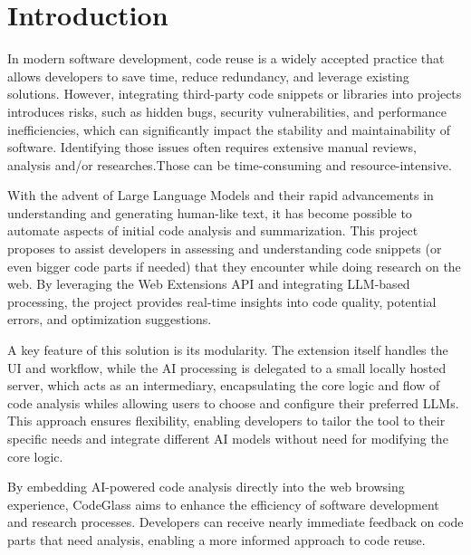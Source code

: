 \section{Introduction}

In modern software development, code reuse is a widely accepted practice that
allows developers to save time, reduce redundancy, and leverage existing solutions.
However, integrating third-party code snippets or libraries into projects introduces 
risks, such as hidden bugs, security vulnerabilities, and
performance inefficiencies, which can significantly impact the stability and
maintainability of software. Identifying those issues often requires extensive
manual reviews, analysis and/or researches.Those can be time-consuming and
resource-intensive.

With the advent of Large Language Models and their rapid advancements in
understanding and generating human-like text, it has become possible to automate
aspects of initial code analysis and summarization. This project proposes to
assist developers in assessing and understanding code snippets (or even bigger
code parts if needed) that they encounter while doing research on the web. By
leveraging the Web Extensions API \autocite{CFD} and integrating LLM-based
processing, the project provides real-time insights into code quality,
potential errors, and optimization suggestions.

A key feature of this solution is its modularity. The extension itself handles
the UI and workflow, while the AI processing is delegated to a small locally hosted
server, which acts as an intermediary, encapsulating the core
logic and flow of code analysis whiles allowing users to choose and configure their
preferred LLMs. This approach ensures flexibility, enabling developers
to tailor the tool to their specific needs and integrate different
AI models without need for modifying the core logic.

By embedding AI-powered code analysis directly into the web browsing experience,
CodeGlass aims to enhance the efficiency of software development and research
processes. Developers can receive nearly immediate feedback on code parts that
need analysis, enabling a more informed approach to code reuse.
